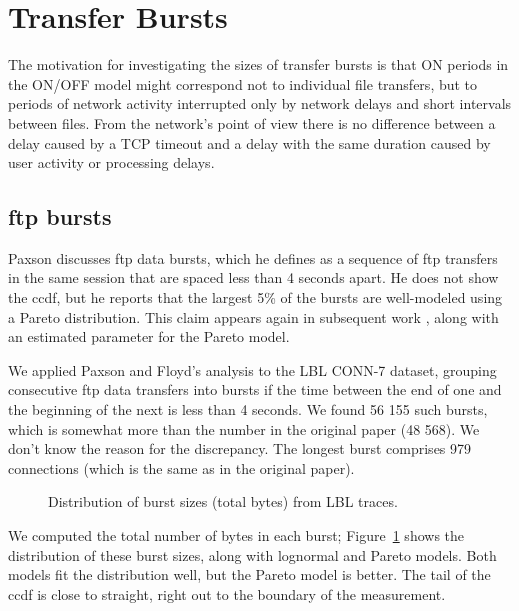 \documentclass{elsart}
\begin{document}
\section {Transfer Bursts}
\label{burst}

The motivation for investigating the sizes of transfer bursts is
that ON periods in the ON/OFF model might correspond not to
individual file transfers, but to periods of network activity
interrupted only by network delays and short intervals between files.
From the network's point of view there is no difference between a
delay caused by a TCP timeout and a delay with the same duration
caused by user activity or processing delays.


\subsection {ftp bursts}

Paxson \cite{Paxson94} discusses ftp data bursts, which he defines as
a sequence of ftp transfers in the same session that are spaced less
than 4 seconds apart.  He does not show the ccdf, but he reports that
the largest 5\% of the bursts are well-modeled using a Pareto
distribution.  This claim appears again in subsequent work
\cite{PaxsonFloyd95}, along with an estimated parameter for the Pareto
model.

We applied Paxson and Floyd's analysis to the LBL CONN-7 dataset,
grouping consecutive ftp data transfers into bursts if the time
between the end of one and the beginning of the next is less than 4
seconds.  We found 56 155 such bursts, which is somewhat more than the
number in the original paper (48 568).  We don't know the reason for
the discrepancy.  The longest burst comprises 979 connections (which
is the same as in the original paper).


\begin{figure}[tb]
\centerline{}
\caption{Distribution of burst sizes (total bytes) from LBL traces.}
\label{fig.bursts}
\end{figure}

We computed the total number of bytes in each burst;
Figure~\ref{fig.bursts} shows the distribution of these burst sizes,
along with lognormal and Pareto models.
Both models fit the distribution well, but the Pareto model is
better.  The tail of the ccdf is close to straight, right out to the
boundary of the measurement.
\end{document}
